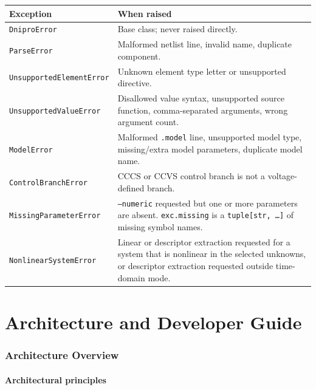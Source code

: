 \documentclass[11pt,a4paper]{article}
\newcommand{\code}[1]{\texttt{#1}}
\begin{document}
\begin{longtable}{p{}p{}}
\toprule
Exception & When raised \\
\midrule
\code{DniproError}           & Base class; never raised directly. \\
\code{ParseError}            & Malformed netlist line, invalid name, duplicate component. \\
\code{UnsupportedElementError} & Unknown element type letter or unsupported directive. \\
\code{UnsupportedValueError} & Disallowed value syntax, unsupported source function,
                               comma-separated arguments, wrong argument count. \\
\code{ModelError}            & Malformed \code{.model} line, unsupported model type,
                               missing/extra model parameters, duplicate model name. \\
\code{ControlBranchError}    & CCCS or CCVS control branch is not a voltage-defined branch. \\
\code{MissingParameterError} & \code{--numeric} requested but one or more parameters
                               are absent.
                               \code{exc.missing} is a \code{tuple[str,~\ldots{}]} of
                               missing symbol names. \\
\code{NonlinearSystemError}  & Linear or descriptor extraction requested for a system
                               that is nonlinear in the selected unknowns, or descriptor
                               extraction requested outside time-domain mode. \\
\bottomrule
\end{longtable}

\part{Architecture and Developer Guide}

\section{Architecture Overview}
\label{sec:architecture}

\subsection{Architectural principles}
\end{document}
